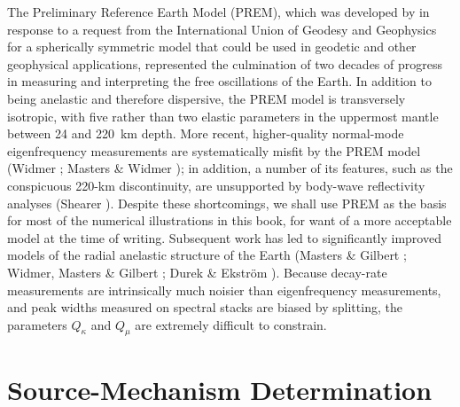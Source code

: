 %
The Preliminary Reference Earth Model (PREM), which was
developed by \textcite{dziewonski&anderson81}
in response to a request from the International
Union of Geodesy and Geophysics for a spherically symmetric
model that could be used in geodetic and other geophysical
applications, represented the culmination of two decades of
progress in measuring and interpreting the free oscillations
of the Earth.  In addition to being anelastic and therefore
dispersive, the PREM model is transversely isotropic, with
five rather than two elastic parameters in the uppermost
mantle between 24 and 220~km depth.  More recent, higher-quality
normal-mode eigenfrequency measurements are systematically misfit
by the PREM model (Widmer \citeyear{widmer91};
Masters \& Widmer \citeyear{masters&widmer95});
in addition, a number of its features, such as the
conspicuous 220-km discontinuity, are unsupported by
body-wave reflectivity analyses (Shearer \citeyear{shearer91}).
Despite these shortcomings, we shall use PREM as the basis for most
of the numerical illustrations in this book, for
want of a more acceptable model at the time of writing.
Subsequent work has led to significantly improved models of the
radial anelastic structure of the Earth
(Masters \& Gilbert \citeyear{masters&gilbert83};
Widmer, Masters \& Gilbert \citeyear{widmer&al91};
Durek \& Ekstr\"{o}m \citeyear{durek&ekstrom96}).
Because decay-rate measurements are intrinsically much
noisier than eigenfrequency measurements, and peak widths
measured on spectral stacks are biased by splitting,
the parameters $Q_{\kappa}$ and $Q_{\mu}$
are extremely difficult to constrain.
%

\section{Source-Mechanism Determination}

